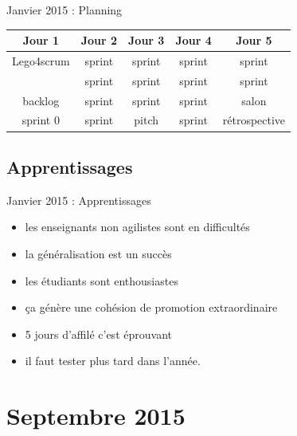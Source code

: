 \documentclass{beamer}
\begin{document}
\begin{frame}{Janvier 2015 : Planning}
  \begin{center}
    \begin{tabular}{| c | c | c | c | c |}
      \hline
      \textbf{Jour 1} & \textbf{Jour 2} & \textbf{Jour 3} & \textbf{Jour 4} & \textbf{Jour 5} \\
      \hline \hline
      Lego4scrum      & sprint          & sprint          & sprint          & sprint          \\
      \hline
                      & sprint          & sprint          & sprint          & sprint          \\
      \hline \hline
      backlog         & sprint          & sprint          & sprint          & salon           \\
      \hline
      sprint 0        & sprint          & pitch           & sprint          & rétrospective   \\
      \hline
    \end{tabular}
  \end{center}
\end{frame}

\subsection{Apprentissages}
\begin{frame}{Janvier 2015 : Apprentissages}
  \begin{itemize}
    \item les enseignants non agilistes sont en difficultés
    \item la généralisation est un succès
    \item les étudiants sont enthousiastes
    \item ça génère une cohésion de promotion extraordinaire
    \item 5 jours d'affilé c'est éprouvant
    \item il faut tester plus tard dans l'année.
  \end{itemize}
\end{frame}

\section{Septembre 2015}
\end{document}
